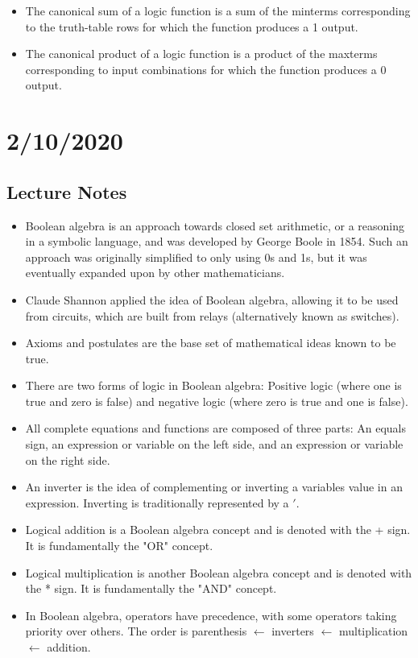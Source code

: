 \documentclass[10pt,a4paper]{article}
\begin{document}
\begin{itemize}
\item The canonical sum of a logic function is a sum of the minterms corresponding to the truth-table rows for which the function produces a 1 output. 
\item The canonical product of a logic function is a product of the maxterms corresponding to input combinations for which the function produces a 0 output. 
\end{itemize}\pagebreak
\section{2/10/2020}
\subsection{Lecture Notes}
\begin{itemize}
\item Boolean algebra is an approach towards closed set arithmetic, or a reasoning in a symbolic language, and was developed by George Boole in 1854. Such an approach was originally simplified to only using 0s and 1s, but it was eventually expanded upon by other mathematicians. 
\item Claude Shannon applied the idea of Boolean algebra, allowing it to be used from circuits, which are built from relays (alternatively known as switches). 
\item Axioms and postulates are the base set of mathematical ideas known to be true. 
\item There are two forms of logic in Boolean algebra: Positive logic (where one is true and zero is false) and negative logic (where zero is true and one is false). 
\item All complete equations and functions are composed of three parts: An equals sign, an expression or variable on the left side, and an expression or variable on the right side. 
\item An inverter is the idea of complementing or inverting a variables value in an expression. Inverting is traditionally represented by a $'$. 
\item Logical addition is a Boolean algebra concept and is denoted with the + sign. It is fundamentally the "OR" concept. 
\item Logical multiplication is another Boolean algebra concept and is denoted with the * sign. It is fundamentally the "AND" concept.
\item In Boolean algebra, operators have precedence, with some operators taking priority over others. The order is parenthesis $\gets$ inverters $\gets$ multiplication $\gets$ addition. 

\end{itemize}
\end{document}
